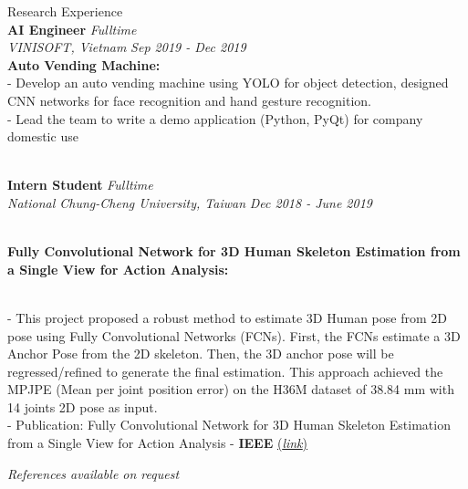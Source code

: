 \documentclass{resume} %
\begin{document}
\begin{rSection}{Research Experience}
\\ {\bf AI Engineer} \hfill {\em Fulltime} 
\\{\textit{VINISOFT, Vietnam}} \hfill {\em Sep 2019 - Dec 2019}
\\ {\bf Auto Vending Machine:}
\\ - Develop an auto vending machine using YOLO for object detection, designed CNN networks for face recognition and hand gesture recognition. 
\\ - Lead the team to write a demo application (Python, PyQt) for company domestic use

\\ {\bf Intern Student} \hfill {\em Fulltime} 
\\{\textit{National Chung-Cheng University, Taiwan}} \hfill {\em Dec 2018 - June 2019}

\\ {\bf Fully Convolutional Network for 3D Human Skeleton Estimation from a Single View for Action Analysis:}

\\ - This project proposed a robust method to estimate 3D Human pose from 2D pose using Fully Convolutional Networks (FCNs). First, the FCNs estimate a 3D Anchor Pose from the 2D skeleton. Then, the 3D anchor pose will be regressed/refined to generate the final estimation. This approach achieved the MPJPE (Mean per joint position error) on the H36M dataset of 38.84 mm with 14 joints 2D pose as input.
\\ - Publication: {\small Fully Convolutional Network for 3D Human Skeleton Estimation from a Single View for Action Analysis - \textbf {IEEE} \href{https://ieeexplore.ieee.org/document/8795015/citations?tabFilter=papers#citations}{(\textit{link})}}
\end{rSection}

\begin{center}
\textit{References available on request}
\end{center}
\end{document}
